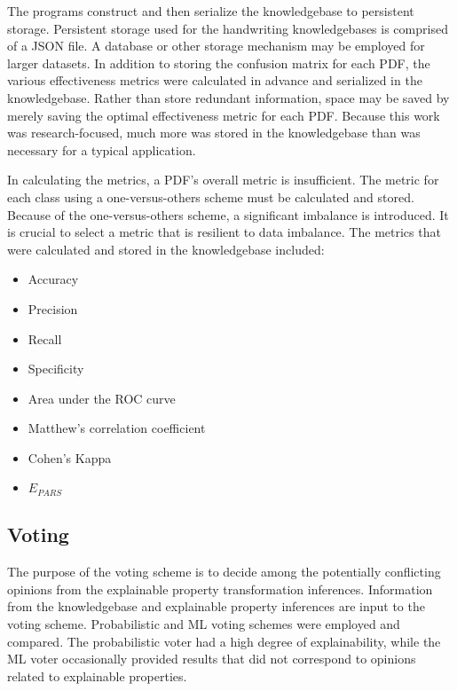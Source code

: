 The programs construct and then serialize the knowledgebase to persistent
storage. Persistent storage used for the handwriting knowledgebases is comprised
of a JSON file. A database or other storage mechanism may be employed for larger
datasets. In addition to storing the confusion matrix for each PDF, the various
effectiveness metrics were calculated in advance and serialized in the
knowledgebase. Rather than store redundant information, space may be saved by
merely saving the optimal effectiveness metric for each PDF. Because this work
was research-focused, much more was stored in the knowledgebase than was
necessary for a typical application.

In calculating the metrics, a PDF's overall metric is insufficient. The metric
for each class using a one-versus-others scheme must be calculated and stored.
Because of the one-versus-others scheme, a significant imbalance is introduced.
It is crucial to select a metric that is resilient to data imbalance. The
metrics that were calculated and stored in the knowledgebase included:

\begin{itemize}
    \item Accuracy
    \item Precision
    \item Recall 
    \item Specificity 
    \item Area under the ROC curve
    \item Matthew's correlation coefficient
    \item Cohen's Kappa
    \item $E_{PARS}$
\end{itemize}


\subsection{Voting}

The purpose of the voting scheme is to decide among the potentially conflicting
opinions from the explainable property transformation inferences. Information
from the knowledgebase and explainable property inferences are input to the
voting scheme. Probabilistic and ML voting schemes were employed and compared.
The probabilistic voter had a high degree of explainability, while the ML voter
occasionally provided results that did not correspond to opinions related to
explainable properties.

